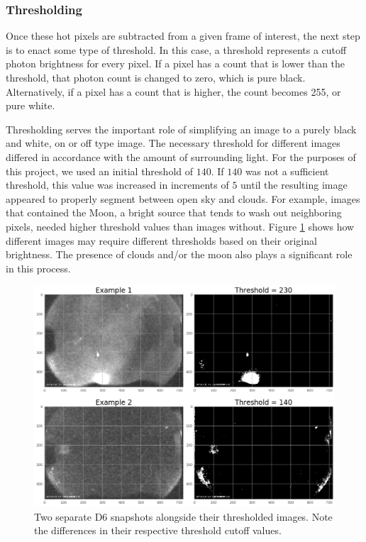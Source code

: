 \subsubsection{Thresholding}

Once these hot pixels are subtracted from a given frame of interest, the next step is to enact some type of threshold.
In this case, a threshold represents a cutoff photon brightness for every pixel.  
If a pixel has a count that is lower than the threshold, that photon count is changed to zero, which is pure black.  
Alternatively, if a pixel has a count that is higher, the  count becomes 255, or pure white.  

Thresholding serves the important role of simplifying an image to a purely black and white, on or off type image.
The necessary threshold for different images differed in accordance with the amount of surrounding light.
For the purposes of this project, we used an initial threshold of $140$.
If $140$ was not a sufficient threshold, this value was increased in increments of $5$ until the resulting image appeared to properly segment between open sky and clouds. 
For example, images that contained the Moon, a bright source that tends to wash out neighboring pixels, needed higher threshold values than images without.
Figure \ref{dif_thresholds} shows how different images may require different thresholds based on their original brightness.
The presence of clouds and/or the moon also plays a significant role in this process.

\begin{figure}[ht!]
  \centering
  \includegraphics[scale=0.4]{images/different_thresholds.png}
  \caption{Two separate D6 snapshots alongside their thresholded images.  Note the differences in their respective threshold cutoff values.}
  \label{dif_thresholds}
\end{figure}

